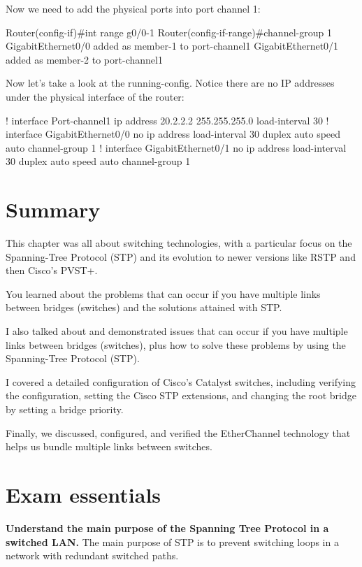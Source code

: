 Now we need to add the physical ports into port channel 1:

\begin{cli}
Router(config-if)#int range g0/0-1
Router(config-if-range)#channel-group 1
GigabitEthernet0/0 added as member-1 to port-channel1
GigabitEthernet0/1 added as member-2 to port-channel1
\end{cli}

Now let's take a look at the running-config. Notice there are no IP
addresses under the physical interface of the router:

\begin{cli}
!
interface Port-channel1
 ip address 20.2.2.2 255.255.255.0
 load-interval 30
!
 interface GigabitEthernet0/0
 no ip address
 load-interval 30
 duplex auto
 speed auto
 channel-group 1
!
 interface GigabitEthernet0/1
 no ip address
 load-interval 30
 duplex auto
 speed auto
 channel-group 1
\end{cli}

\section{Summary}

This chapter was all about switching technologies, with a particular focus on the Spanning-Tree Protocol (STP) and its evolution to newer
versions like RSTP and then Cisco's PVST+.

You learned about the problems that can occur if you have multiple links between bridges (switches) and the solutions attained with STP.

I also talked about and demonstrated issues that can occur if you have multiple links between bridges (switches), plus how to solve these
problems by using the Spanning-Tree Protocol (STP).

I covered a detailed configuration of Cisco's Catalyst switches, including verifying the configuration, setting the Cisco STP extensions,
and changing the root bridge by setting a bridge priority.

Finally, we discussed, configured, and verified the EtherChannel technology that helps us bundle multiple links between switches.




\section{Exam essentials}

\textbf{Understand the main purpose of the Spanning Tree Protocol in a
switched LAN.} The main purpose of STP is to prevent switching loops in
a network with redundant switched paths.

